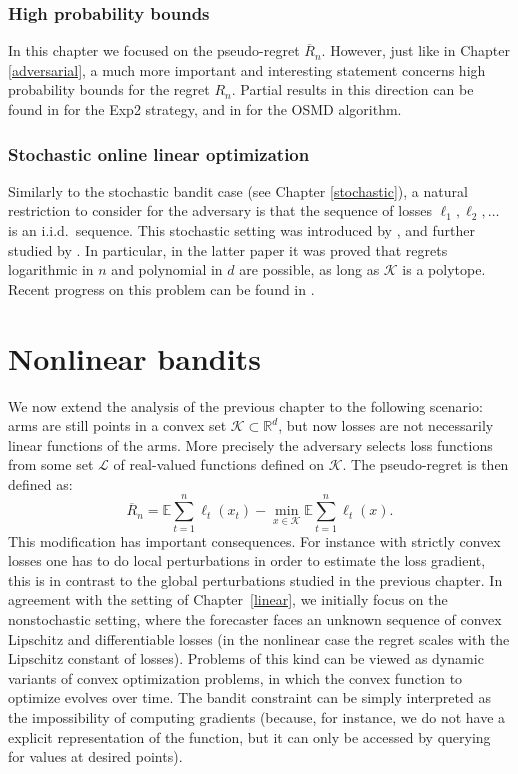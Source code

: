 \documentclass[11pt]{hackednow}
\newcommand{\E}{\mathbb{E}}
\newcommand{\R}{\mathbb{R}}
\newcommand{\cL}{\mathcal{L}}
\newcommand{\cK}{\mathcal{K}}
\newcommand{\oR}{\overline{R}}
\begin{document}
\subsection{High probability bounds} \label{sec:hplinear}
In this chapter we focused on the pseudo-regret $\oR_n$. However, just like in Chapter \ref{adversarial}, a much more important and interesting statement concerns high probability bounds for the regret $R_n$. Partial results in this direction can be found in \cite{BDHKRT08} for the Exp2 strategy, and in \cite{AR09} for the OSMD algorithm.

\subsection{Stochastic online linear optimization} \label{sec:stochlinear}
Similarly to the stochastic bandit case (see Chapter \ref{stochastic}), a natural restriction to consider for the adversary is that the sequence of losses $\ell_1,\ell_2,\ldots$ is an i.i.d.\ sequence. This stochastic setting was introduced by \cite{Aue02}, and further studied by \cite{DHK08b}. In particular, in the latter paper it was proved that regrets logarithmic in $n$ and polynomial in $d$ are possible, as long as $\cK$ is a polytope. Recent progress on this problem can be found in \cite{RT10, filippi2010parametric, APS11}.


\chapter{Nonlinear bandits}
\label{nonlinear}
We now extend the analysis of the previous chapter to the following scenario: arms are still points in a convex set $\cK \subset \R^d$, but now losses are not necessarily linear functions of the arms. More precisely the adversary selects loss functions from some set $\cL$ of real-valued functions defined on $\cK$. The pseudo-regret is then defined as:
$$\oR_n = \E \sum_{t=1}^n  \ell_t(x_t) - \min_{x \in \cK} \E \sum_{t=1}^n \ell_t(x) .$$
This modification has important consequences.
For instance with strictly convex losses one has to do local perturbations in order to estimate the loss gradient, this is in contrast to the global perturbations studied in the previous chapter.
In agreement with the setting of Chapter~\ref{linear}, we initially focus on the nonstochastic setting, where the forecaster faces an unknown sequence of convex Lipschitz and differentiable losses (in the nonlinear case the regret scales with the Lipschitz constant of losses). Problems of this kind can be viewed as dynamic variants of convex optimization problems, in which the convex function to optimize evolves over time. The bandit constraint can be simply interpreted as the impossibility of computing gradients (because, for instance, we do not have a explicit representation of the function, but it can only be accessed by querying for values at desired points).
\end{document}
